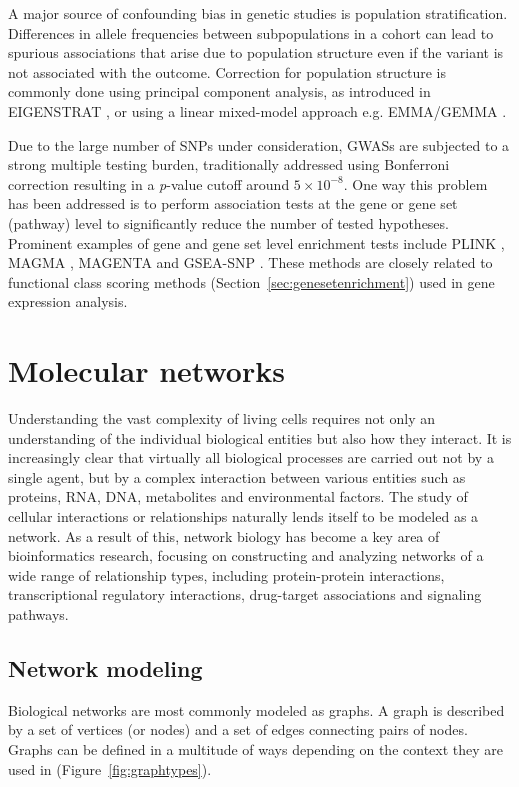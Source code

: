 A major source of confounding bias in genetic studies is population stratification. Differences in allele frequencies between subpopulations in a cohort can lead to spurious associations that arise due to population structure even if the variant is not associated with the outcome. Correction for population structure is commonly done using principal component analysis, as introduced in EIGENSTRAT \cite{Price2006}, or using a linear mixed-model approach e.g. EMMA/GEMMA \cite{Kang2008,Zhou2012}.

Due to the large number of SNPs under consideration, GWASs are subjected to a strong multiple testing burden, traditionally addressed using Bonferroni correction resulting in a \textit{p}-value cutoff around $5 \times 10^{-8}$. One way this problem has been addressed is to perform association tests at the gene or gene set (pathway) level to significantly reduce the number of tested hypotheses. Prominent examples of gene and gene set level enrichment tests include PLINK \cite{Chang2015}, MAGMA \cite{Leeuw2015}, MAGENTA \cite{Segre2010} and GSEA-SNP \cite{Holden2008}. These methods are closely related to functional class scoring methods (Section~\ref{sec:genesetenrichment}) used in gene expression analysis.

\section{Molecular networks}
Understanding the vast complexity of living cells requires not only an understanding of the individual biological entities but also how they interact. It is increasingly clear that virtually all biological processes are carried out not by a single agent, but by a complex interaction between various entities such as proteins, RNA, DNA, metabolites and environmental factors. The study of cellular interactions or relationships naturally lends itself to be modeled as a network. As a result of this, network biology has become a key area of bioinformatics research, focusing on constructing and analyzing networks of a wide range of relationship types, including protein-protein interactions, transcriptional regulatory interactions, drug-target associations and signaling pathways.

\subsection{Network modeling}
Biological networks are most commonly modeled as graphs. A graph is described by a set of vertices (or nodes) and a set of edges connecting pairs of nodes. Graphs can be defined in a multitude of ways depending on the context they are used in (Figure~\ref{fig:graphtypes}).

